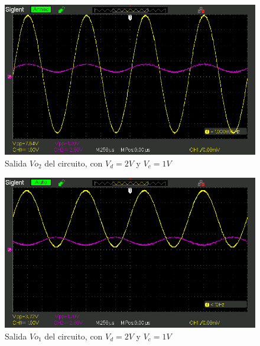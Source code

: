 \begin{figure}[H]
    \centering
    \includegraphics[width=0.75\linewidth]{oscilo1_3.jpg}
    \caption{Salida \(Vo_2\) del circuito, con $V_d = 2V$ y $V_c = 1V$}
    \label{fig:enter-label}
\end{figure}

\begin{figure}[H]
    \centering
    \includegraphics[width=0.75\linewidth]{oscilo1_4.jpg}
    \caption{Salida \(Vo_1\) del circuito, con $V_d = 2V$ y $V_c = 1V$}
    \label{fig:enter-label}
\end{figure}